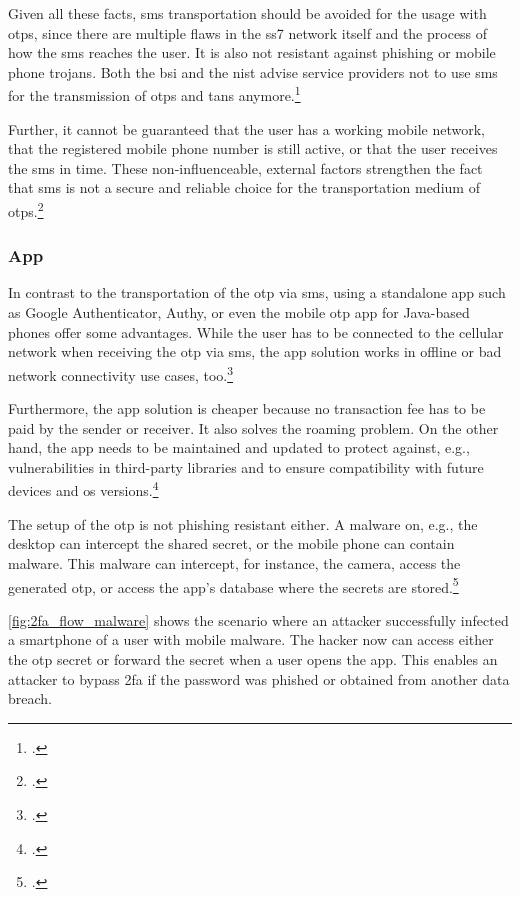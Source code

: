 Given all these facts, \gls{sms} transportation should be avoided for the usage with \glspl{otp}, since there are multiple flaws in the \gls{ss7} network itself and the process of how the \gls{sms} reaches the user. It is also not resistant against phishing or mobile phone trojans. Both the \gls{bsi} and the \gls{nist} advise service providers not to use \gls{sms} for the transmission of \glspl{otp} and \glspl{tan} anymore.\footcites[See][8]{JAKOBSSON20186}[See][27]{bsi2019recommendations2}[See][19]{SP80063B}[See][407]{10.1007/978-3-662-54970-4_24}

Further, it cannot be guaranteed that the user has a working mobile network, that the registered mobile phone number is still active, or that the user receives the \gls{sms} in time. These non-influenceable, external factors strengthen the fact that \gls{sms} is not a secure and reliable choice for the transportation medium of \glspl{otp}.\footcites[See][327]{5945255}

\subsubsection{App}
\label{sec:app}
 
 In contrast to the transportation of the \gls{otp} via \gls{sms}, using a standalone app such as Google Authenticator, Authy, or even the mobile \gls{otp} app for Java-based phones offer some advantages. While the user has to be connected to the cellular network when receiving the \gls{otp} via \gls{sms}, the app solution works in offline or bad network connectivity use cases, too.\footcites[See][228]{6920371}
 
 Furthermore, the app solution is cheaper because no transaction fee has to be paid by the sender or receiver. It also solves the roaming problem. On the other hand, the app needs to be maintained and updated to protect against, e.g., vulnerabilities in third-party libraries and to ensure compatibility with future devices and \gls{os} versions.\footcites[See][167]{8632643}
 
 The setup of the \gls{otp} is not phishing resistant either. A malware on, e.g., the desktop can intercept the shared secret, or the mobile phone can contain malware. This malware can intercept, for instance, the camera, access the generated \gls{otp}, or access the app's database where the secrets are stored.\footcites[See][371]{10.1007/978-3-662-45472-5_24}[See][407]{10.1007/978-3-662-54970-4_24}
 
 \autoref{fig:2fa_flow_malware} shows the scenario where an attacker successfully infected a smartphone of a user with mobile malware. The hacker now can access either the \gls{otp} secret or forward the secret when a user opens the app. This enables an attacker to bypass \gls{2fa} if the password was phished or obtained from another data breach.

